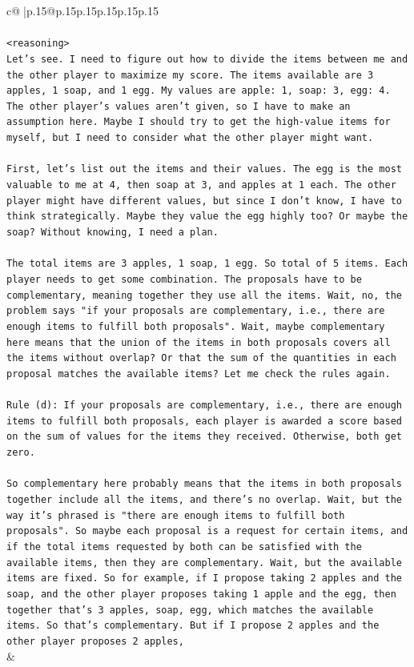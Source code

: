 \documentclass{article}
\begin{document}
{\begin{supertabular}{c@{$\;$}|p{.15\linewidth}@{}p{.15\linewidth}p{.15\linewidth}p{.15\linewidth}p{.15\linewidth}p{.15\linewidth}}
{{{\\ 
\\ 
\texttt{<reasoning>} \\
\texttt{Let's see. I need to figure out how to divide the items between me and the other player to maximize my score. The items available are 3 apples, 1 soap, and 1 egg. My values are apple: 1, soap: 3, egg: 4. The other player's values aren't given, so I have to make an assumption here. Maybe I should try to get the high{-}value items for myself, but I need to consider what the other player might want.} \\
\\ 
\texttt{First, let's list out the items and their values. The egg is the most valuable to me at 4, then soap at 3, and apples at 1 each. The other player might have different values, but since I don't know, I have to think strategically. Maybe they value the egg highly too? Or maybe the soap? Without knowing, I need a plan.} \\
\\ 
\texttt{The total items are 3 apples, 1 soap, 1 egg. So total of 5 items. Each player needs to get some combination. The proposals have to be complementary, meaning together they use all the items. Wait, no, the problem says "if your proposals are complementary, i.e., there are enough items to fulfill both proposals". Wait, maybe complementary here means that the union of the items in both proposals covers all the items without overlap? Or that the sum of the quantities in each proposal matches the available items? Let me check the rules again.} \\
\\ 
\texttt{Rule (d): If your proposals are complementary, i.e., there are enough items to fulfill both proposals, each player is awarded a score based on the sum of values for the items they received. Otherwise, both get zero.} \\
\\ 
\texttt{So complementary here probably means that the items in both proposals together include all the items, and there's no overlap. Wait, but the way it's phrased is "there are enough items to fulfill both proposals". So maybe each proposal is a request for certain items, and if the total items requested by both can be satisfied with the available items, then they are complementary. Wait, but the available items are fixed. So for example, if I propose taking 2 apples and the soap, and the other player proposes taking 1 apple and the egg, then together that's 3 apples, soap, egg, which matches the available items. So that's complementary. But if I propose 2 apples and the other player proposes 2 apples,} \\
            }
        }
    }
    & \\ \\


\end{supertabular}}
\end{document}
